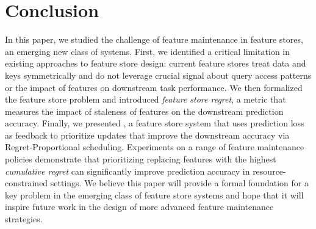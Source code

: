 \section{Conclusion}
\label{s:conclusions}

In this paper, we studied the challenge of feature maintenance in feature stores, an emerging new class of systems.
First, we identified a critical limitation in existing approaches to feature store design: current feature stores treat data and keys symmetrically and do not leverage crucial signal about query access patterns or the impact of features on downstream task performance.
We then formalized the feature store problem and introduced \textit{feature store regret}, a metric that measures the impact of staleness of features on the downstream prediction accuracy.
Finally, we presented \system{}, a feature store system that uses prediction loss as feedback to prioritize updates that improve the downstream accuracy via Regret-Proportional scheduling.
Experiments on a range of feature maintenance policies demonstrate that prioritizing replacing features with the highest \textit{cumulative regret} can significantly improve prediction accuracy in resource-constrained settings. We believe this paper will provide a formal foundation for a key problem in the emerging class of feature store systems and hope that it will inspire future work in the design of more advanced feature maintenance strategies.

